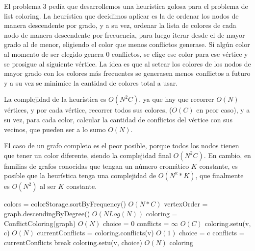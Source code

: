 \documentclass{article}
\theoremstyle{definition}
\theoremstyle{remark}
\begin{document}
El problema 3 pedía que desarrollemos una heurística golosa para el problema
de list coloring. La heurística que decidimos aplicar es la de ordenar los nodos de manera descendente por grado, y a su vez, ordenar la lista de colores de cada nodo de manera descendente por frecuencia, para luego iterar desde el de mayor grado al de menor, eligiendo el color que menos conflictos generase. Si algún color al momento de ser elegido genera 0 conflictos, se elige ese color para ese vértice y se prosigue al siguiente vértice. 
La idea es que al setear los colores de los nodos de mayor grado con los colores más frecuentes se generasen menos conflictos a futuro y a su vez se minimice la cantidad de colores total a usar.

La complejidad de la heurística es $O(N^{2}C)$, ya que hay que recorrer $O(N)$ vértices, y por cada vértice, recorrer todos sus colores, ($O(C)$ en peor caso), y a su vez, para cada color, calcular la cantidad de conflictos del vértice con sus vecinos, que pueden ser a lo sumo $O(N)$.

El caso de un grafo completo es el peor posible, porque todos los nodos tienen que tener un color diferente, siendo la complejidad final $O(N^{2}C)$.
En cambio, en familias de grafos conocidas que tengan un número cromático $K$ constante, es posible que la heurística tenga una complejidad de $O(N^2 * K)$, que finalmente es $O(N^2)$ al ser $K$ constante.



\begin{algorithmic}
\State colors = colorStorage.sortByFrequency() \Comment $O(N*C)$
\State vertexOrder = graph.descendingByDegree() \Comment $O(N Log(N))$
\State coloring = ConflictColoring(graph)
  \Comment $O(N)$
    \State choice = 0
    \State conflicts = $\infty$
            \Comment $O(C)$
        \State coloring.setu(v, c) \Comment $O(N)$
        \State currentConflicts = coloring.conflicts(v) \Comment $O(1)$
            \State choice = c
            \State conflicts = currentConflicts
                \State break
            \EndIf
        \EndIf
    \EndFor
    \State coloring.setu(v, choice) \Comment $O(N)$
\EndFor
\State \Return coloring
\EndFunction
\end{algorithmic}
\end{document}

